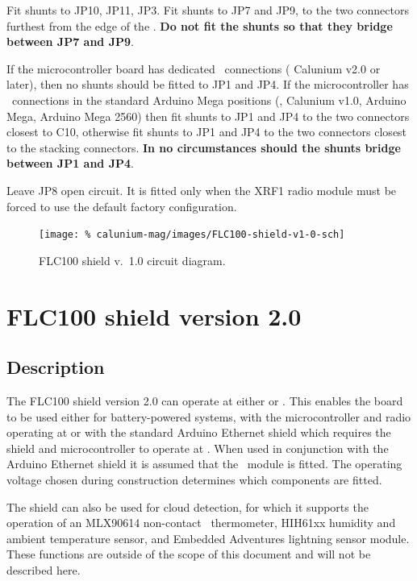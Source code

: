 Fit shunts to JP10, JP11, JP3. Fit shunts to JP7 and JP9, to the two
connectors furthest from the edge of the \pcb. \textbf{Do not fit the
  shunts so that they bridge between JP7 and JP9}.

If the microcontroller board has dedicated \itwoc\ connections (\eg
Calunium v2.0 or later), then no shunts should be fitted to JP1 and
JP4. If the microcontroller has \itwoc\ connections in the standard
Arduino Mega positions (\eg, Calunium v1.0, Arduino Mega, Arduino Mega
2560) then fit shunts to JP1 and JP4 to the two connectors closest to
C10, otherwise fit shunts to JP1 and JP4 to the two connectors closest
to the stacking connectors. \textbf{In no circumstances should the
  shunts bridge between JP1 and JP4}.

Leave JP8 open circuit. It is fitted only when the XRF1 radio module
must be forced to use the default factory configuration.

\begin{landscape}
  \begin{figure}[p]
    \centering
    \texttt{[image: \%
      calunium-mag/images/FLC100-shield-v1-0-sch]}
    \caption{FLC100 shield v.~1.0 circuit diagram.}
    \label{fig:flc100-shield-v1.0-cct-diag}
  \end{figure}
\end{landscape}

\section{FLC100 shield version 2.0}

\subsection{Description}

The FLC100 shield version 2.0 can operate at either  or
. This enables the board to be used either for battery-powered
systems, with the microcontroller and radio operating at  or
with the standard Arduino Ethernet shield which requires the shield
and microcontroller to operate at . When used in conjunction
with the Arduino Ethernet shield it is assumed that the \PoE\ module
is fitted. The operating voltage chosen during construction determines
which components are fitted.

The shield can also be used for cloud detection, for which it supports
the operation of an MLX90614 non-contact \ir\ thermometer, HIH61xx
humidity and ambient temperature sensor, and Embedded Adventures
lightning sensor module. These functions are outside of the scope of
this document and will not be described here.

